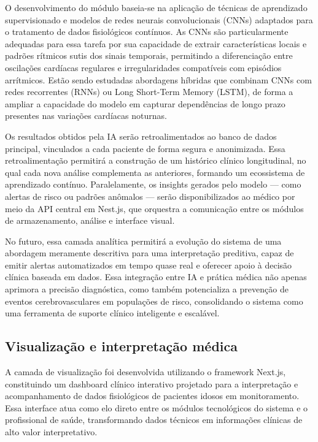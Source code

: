 O desenvolvimento do módulo baseia-se na aplicação de técnicas de aprendizado supervisionado e modelos de redes neurais convolucionais (CNNs) adaptados para o tratamento de dados fisiológicos contínuos. As CNNs são particularmente adequadas para essa tarefa por sua capacidade de extrair características locais e padrões rítmicos sutis dos sinais temporais, permitindo a diferenciação entre oscilações cardíacas regulares e irregularidades compatíveis com episódios arrítmicos. Estão sendo estudadas abordagens híbridas que combinam CNNs com redes recorrentes (RNNs) ou Long Short-Term Memory (LSTM), de forma a ampliar a capacidade do modelo em capturar dependências de longo prazo presentes nas variações cardíacas noturnas.

Os resultados obtidos pela IA serão retroalimentados ao banco de dados principal, vinculados a cada paciente de forma segura e anonimizada. Essa retroalimentação permitirá a construção de um histórico clínico longitudinal, no qual cada nova análise complementa as anteriores, formando um ecossistema de aprendizado contínuo. Paralelamente, os insights gerados pelo modelo — como alertas de risco ou padrões anômalos — serão disponibilizados ao médico por meio da API central em Nest.js, que orquestra a comunicação entre os módulos de armazenamento, análise e interface visual.

No futuro, essa camada analítica permitirá a evolução do sistema de uma abordagem meramente descritiva para uma interpretação preditiva, capaz de emitir alertas automatizados em tempo quase real e oferecer apoio à decisão clínica baseada em dados. Essa integração entre IA e prática médica não apenas aprimora a precisão diagnóstica, como também potencializa a prevenção de eventos cerebrovasculares em populações de risco, consolidando o sistema como uma ferramenta de suporte clínico inteligente e escalável.

\subsection*{Visualização e interpretação médica}

A camada de visualização foi desenvolvida utilizando o framework Next.js, constituindo um dashboard clínico interativo projetado para a interpretação e acompanhamento de dados fisiológicos de pacientes idosos em monitoramento. Essa interface atua como elo direto entre os módulos tecnológicos do sistema e o profissional de saúde, transformando dados técnicos em informações clínicas de alto valor interpretativo.

